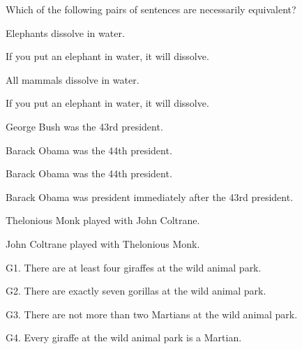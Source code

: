 \problempart Which of the following pairs of sentences are necessarily  equivalent? 
\begin{earg}
\item Elephants dissolve in water.
\item[]	If you put an elephant in water, it will dissolve.\smallskip
\item All mammals dissolve in water.
\item[]	If you put an elephant in water, it will dissolve.\smallskip 

\item George Bush was the 43rd president. 
\item[]	Barack Obama was the 44th president.\smallskip 
\item Barack Obama was the 44th president.
\item[]	Barack Obama was president immediately after the 43rd president.\smallskip 



\item  Thelonious Monk played with John Coltrane.
	\item[]	John Coltrane played with Thelonious Monk.\smallskip

\end{earg}

\problempart  
\begin{earg}%
\item[G1.] \label{itm:at_least_four}There are at least four giraffes at the wild animal park.
\item[G2.] \label{itm:exactly_seven} There are exactly seven gorillas at the wild animal park.
\item[G3.] \label{itm:not_more_than_two} There are not more than two Martians at the wild animal park.
\item[G4.] \label{itm:martians} Every giraffe at the wild animal park is a Martian.
\end{earg}

